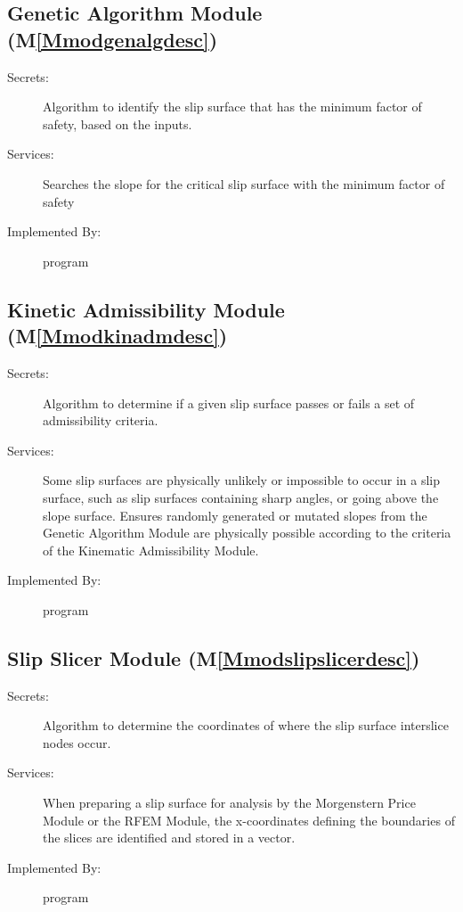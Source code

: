\documentclass[12pt]{article}
\begin{document}
\subsection{Genetic Algorithm Module (M\ref{Mmodgenalgdesc})}
\label{Sec:GAM()}
\begin{description}
\item[Secrets:]Algorithm to identify the slip surface that has the minimum factor of safety, based on the inputs.
\item[Services:]Searches the slope for the critical slip surface with the minimum factor of safety
\item[Implemented By:]program
\end{description}
\subsection{Kinetic Admissibility Module (M\ref{Mmodkinadmdesc})}
\label{Sec:KAM()}
\begin{description}
\item[Secrets:]Algorithm to determine if a given slip surface passes or fails a set of admissibility criteria.
\item[Services:]Some slip surfaces are physically unlikely or impossible to occur in a slip surface, such as slip surfaces containing sharp angles, or going above the slope surface. Ensures randomly generated or mutated slopes from the Genetic Algorithm Module are physically possible according to the criteria of the Kinematic Admissibility Module.
\item[Implemented By:]program
\end{description}
\subsection{Slip Slicer Module (M\ref{Mmodslipslicerdesc})}
\label{Sec:SSM()}
\begin{description}
\item[Secrets:]Algorithm to determine the coordinates of where the slip surface interslice nodes occur.
\item[Services:]When preparing a slip surface for analysis by the Morgenstern Price Module or the RFEM Module, the x-coordinates defining the boundaries of the slices are identified and stored in a vector.
\item[Implemented By:]program
\end{description}
\end{document}

